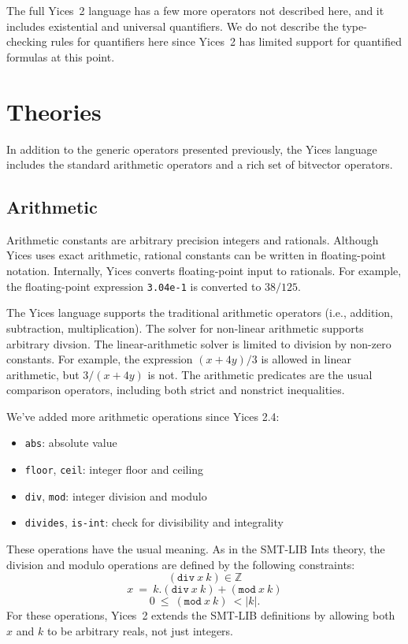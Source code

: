 \documentclass[11pt,twoside,fleqn,openright,titlepage]{cslreport}
\newcommand{\integers}{\ensuremath{\mathbb{Z}}}
\begin{document}
\medskip\noindent
The full Yices~2 language has a few more operators not described here,
and  it includes  existential  and universal  quantifiers.  We do  not
describe the  type-checking rules  for quantifiers here  since Yices~2
has limited support for quantified formulas at this point.


\section{Theories}

In addition  to the generic operators presented  previously, the Yices
language includes the standard arithmetic  operators and a rich set of
bitvector operators.

\subsection{Arithmetic}
\label{arithmetic-general}

Arithmetic constants  are arbitrary precision integers  and rationals.
Although  Yices  uses  exact  arithmetic, rational  constants  can  be
written  in  floating-point   notation.   Internally,  Yices  converts
floating-point input  to rationals.   For example,  the floating-point
expression \texttt{3.04e-1} is converted to $38/125$.

\medskip\noindent The Yices language supports the traditional
arithmetic operators (i.e., addition, subtraction, multiplication).
The solver for non-linear arithmetic supports arbitrary divsion. The
linear-arithmetic solver is limited to division by non-zero constants.
For example, the expression $(x + 4y)/3$ is allowed in linear
arithmetic, but $3/(x + 4y)$ is not. The arithmetic predicates are the
usual comparison operators, including both strict and nonstrict
inequalities.

\medskip\noindent
We've added more arithmetic operations since Yices 2.4:
\begin{itemize}
\item \texttt{abs}: absolute value
\item \texttt{floor}, \texttt{ceil}: integer floor and ceiling
\item \texttt{div}, \texttt{mod}: integer division and modulo
\item \texttt{divides}, \texttt{is-int}: check for divisibility and integrality
\end{itemize}
These operations have the usual meaning. As in the SMT-LIB Ints theory, 
the division and modulo operations are defined by the following constraints:
$$(\mathtt{div}\ x\ k)\in \integers$$
$$x~=~k.(\mathtt{div}\ x\ k) + (\mathtt{mod}\ x\ k)$$
$$0~\leq~(\mathtt{mod}\ x\ k)~< |k|.$$ For these operations, Yices~2
extends the SMT-LIB definitions by allowing both $x$ and $k$ to be
arbitrary reals, not just integers.
\end{document}
